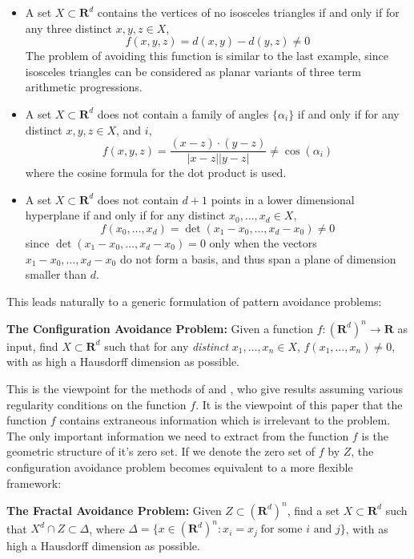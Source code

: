 \documentclass{article}
\theoremstyle{plain}
\theoremstyle{plain}
\begin{document}
\begin{multicols}{2}
\begin{itemize}
	\item A set $X \subset \mathbf{R}^d$ contains the vertices of no isosceles triangles if and only if for any three distinct $x,y,z \in X$,
	\[ f(x,y,z) = d(x,y) - d(y,z) \neq 0 \]
	The problem of avoiding this function is similar to the last example, since isosceles triangles can be considered as planar variants of three term arithmetic progressions.

	\item A set $X \subset \mathbf{R}^d$ does not contain a family of angles $\{ \alpha_i \}$ if and only if for any distinct $x,y,z \in X$, and $i$,
	\[ f(x,y,z) = \frac{(x - z) \cdot (y - z)}{|x - z||y - z|} \neq \cos(\alpha_i) \]
	where the cosine formula for the dot product is used.

	\item A set $X \subset \mathbf{R}^d$ does not contain $d+1$ points in a lower dimensional hyperplane if and only if for any distinct $x_0, \dots, x_d \in X$,
	\[ f(x_0, \dots, x_d) = \det(x_1 - x_0, \dots, x_d - x_0) \neq 0 \]
	since $\det(x_1 - x_0, \dots, x_d - x_0) = 0$ only when the vectors $x_1 - x_0, \dots, x_d - x_0$ do not form a basis, and thus span a plane of dimension smaller than $d$.
\end{itemize}
%
This leads naturally to a generic formulation of pattern avoidance problems:

\begin{changemargin}{0.5em}{0em}
{\bf The Configuration Avoidance Problem:} Given a function $f: (\mathbf{R}^d)^n \to \mathbf{R}$ as input, find $X \subset \mathbf{R}^d$ such that for any {\it distinct} $x_1, \dots, x_n \in X$, $f(x_1, \dots, x_n) \neq 0$, with as high a Hausdorff dimension as possible.
\end{changemargin}

This is the viewpoint for the methods of \cite{MalabikaRob} and \cite{Mathe}, who give results assuming various regularity conditions on the function $f$. It is the viewpoint of this paper that the function $f$ contains extraneous information which is irrelevant to the problem. The only important information we need to extract from the function $f$ is the geometric structure of it's zero set. If we denote the zero set of $f$ by $Z$, the configuration avoidance problem becomes equivalent to a more flexible framework:

\begin{changemargin}{0.5em}{0em}
	{\bf The Fractal Avoidance Problem:} Given $Z \subset (\mathbf{R}^d)^n$, find a set $X \subset \mathbf{R}^d$ such that $X^d \cap Z \subset \Delta$, where $\Delta = \{ x \in (\mathbf{R}^d)^n : x_i = x_j\; \text{for some $i$ and $j$} \}$, with as high a Hausdorff dimension as possible.
\end{changemargin}


\end{multicols}
\end{document}
